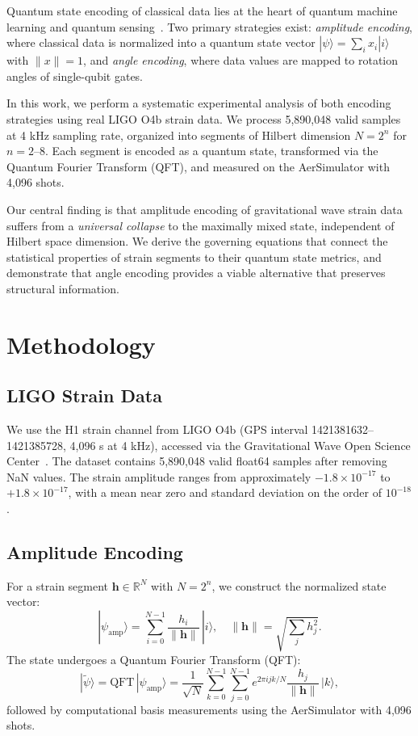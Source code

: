 \documentclass[conference]{IEEEtran}
\begin{document}
Quantum state encoding of classical data lies at the heart of quantum machine learning and quantum sensing~\cite{schuld2018, havlivcek2019}. Two primary strategies exist: \textit{amplitude encoding}, where classical data is normalized into a quantum state vector $|\psi\rangle = \sum_i x_i |i\rangle$ with $\|x\| = 1$, and \textit{angle encoding}, where data values are mapped to rotation angles of single-qubit gates.

In this work, we perform a systematic experimental analysis of both encoding strategies using real LIGO O4b strain data. We process 5,890,048 valid samples at 4 kHz sampling rate, organized into segments of Hilbert dimension $N = 2^n$ for $n = 2$--$8$. Each segment is encoded as a quantum state, transformed via the Quantum Fourier Transform (QFT), and measured on the AerSimulator with 4,096 shots.

Our central finding is that amplitude encoding of gravitational wave strain data suffers from a \textit{universal collapse} to the maximally mixed state, independent of Hilbert space dimension. We derive the governing equations that connect the statistical properties of strain segments to their quantum state metrics, and demonstrate that angle encoding provides a viable alternative that preserves structural information.

\section{Methodology}

\subsection{LIGO Strain Data}

We use the H1 strain channel from LIGO O4b (GPS interval 1421381632--1421385728, 4,096 s at 4 kHz), accessed via the Gravitational Wave Open Science Center~\cite{gwosc}. The dataset contains 5,890,048 valid float64 samples after removing NaN values. The strain amplitude ranges from approximately $-1.8 \times 10^{-17}$ to $+1.8 \times 10^{-17}$, with a mean near zero and standard deviation on the order of $10^{-18}$.

\subsection{Amplitude Encoding}

For a strain segment $\mathbf{h} \in \mathbb{R}^N$ with $N = 2^n$, we construct the normalized state vector:
\begin{equation}
|\psi_{\text{amp}}\rangle = \sum_{i=0}^{N-1} \frac{h_i}{\|\mathbf{h}\|} \, |i\rangle, \quad \|\mathbf{h}\| = \sqrt{\sum_j h_j^2}.
\end{equation}
The state undergoes a Quantum Fourier Transform (QFT):
\begin{equation}
|\tilde{\psi}\rangle = \text{QFT} \, |\psi_{\text{amp}}\rangle = \frac{1}{\sqrt{N}} \sum_{k=0}^{N-1} \sum_{j=0}^{N-1} e^{2\pi i j k / N} \frac{h_j}{\|\mathbf{h}\|} \, |k\rangle,
\end{equation}
followed by computational basis measurements using the AerSimulator with 4,096 shots.
\end{document}

